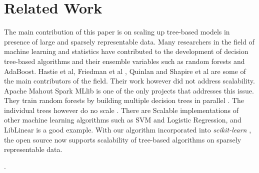 \section{Related Work}
\label{sec:related}

The main contribution of this paper is on scaling up tree-based models in presence of large and sparsely representable data. Many researchers in the field of machine learning and statistics have contributed to the development of decision tree-based algorithms and their ensemble variables such as random forests and AdaBoost. Hastie et al\cite{hastie:book2008}, Friedman et al \cite{breiman1984classification}, Quinlan \cite{Quinlan:1993:CPM:152181} and Shapire et al \cite{Schapire99improvedboosting} are some of the main contributors of the field. Their work however did not address scalability. Apache Mahout Spark MLlib is one of the only projects that addresses this issue. They train random forests by building multiple decision trees in parallel \cite{das:blog2014}. The individual trees however do no scale \cite{Zaharia:2010:SCC:1863103.1863113}. There are Scalable implementations of other machine learning algorithms such as SVM and Logistic Regression, and LibLinear \cite{Chang:2011:LLS:1961189.1961199} is a good example. With our algorithm incorporated into \emph{scikit-learn} \cite{buitinck2013api}, the open source now supports scalability of tree-based algorithms on sparsely representable data. 

. 